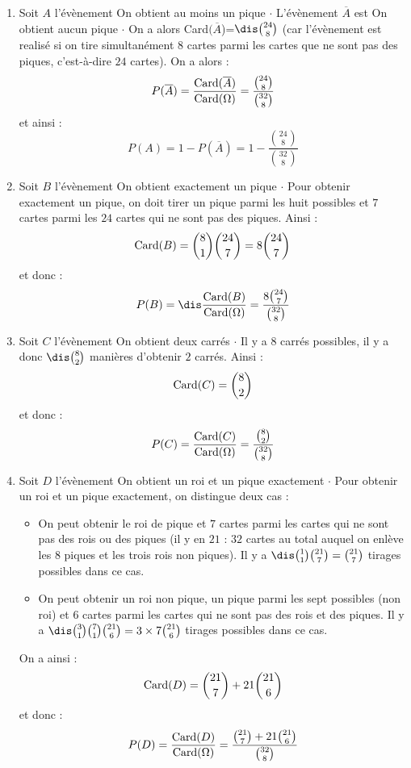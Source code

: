 \documentclass[a4paper,10pt]{report}
\begin{document}
\begin{enumerate}
\item Soit $A$ l'évènement \og On obtient au moins un pique \fg$\cdot$ L'évènement $\overline{A}$ est \og On obtient aucun pique \fg $\cdot$ On a alors Card$(\overline{A}$)=$\dis \binom{24}{8}$ (car l'évènement est realisé si on tire simultanément $8$ cartes parmi les cartes que ne sont pas des piques, c'est-à-dire $24$ cartes). On a alors :
\[ P(\overline{A}) = \frac{\hbox{Card}(\overline{A})}{\hbox{Card}(\Omega)} = \frac{\binom{24}{8}}{\binom{32}{8}}\]
et ainsi :
\[ P(A) = 1 - P(\overline{A}) = 1 - \frac{\binom{24}{8}}{\binom{32}{8}}  \]

\item Soit $B$ l'évènement \og On obtient exactement un pique \fg$\cdot$ Pour obtenir exactement un pique, on doit tirer un pique parmi les huit possibles et $7$ cartes parmi les $24$ cartes qui ne sont pas des piques. Ainsi :
\[ \hbox{Card}(B) = \binom{8}{1} \binom{24}{7} = 8 \binom{24}{7} \]
et donc :
\[ P(B) = \dis \frac{\hbox{Card}(B)}{\hbox{Card}(\Omega)} = \frac{8\binom{24}{7}}{\binom{32}{8}} \]

\item Soit $C$ l'évènement \og On obtient deux carrés \fg$\cdot$ Il y a $8$ carrés possibles, il y a donc $\dis \binom{8}{2}$ manières d'obtenir $2$ carrés. Ainsi :
\[ \hbox{Card}(C) = \binom{8}{2} \]
et donc :
\[ P(C)= \frac{\hbox{Card}(C)}{\hbox{Card}(\Omega)} = \frac{\binom{8}{2}}{\binom{32}{8}}\]

\item Soit $D$ l'évènement \og On obtient un roi et un pique exactement \fg$\cdot$ Pour obtenir un roi et un pique exactement, on distingue deux cas :
\begin{itemize}
\item On peut obtenir le roi de pique et $7$ cartes parmi les cartes qui ne sont pas des rois ou des piques (il y en $21$ : $32$ cartes au total auquel on enlève les $8$ piques et les trois rois non piques). Il y a $\dis \binom{1}{1}\binom{21}{7}=\binom{21}{7}$ tirages possibles dans ce cas.
\item On peut obtenir un roi non pique, un pique parmi les sept possibles (non roi) et $6$ cartes parmi les cartes qui ne sont pas des rois et des piques. Il y a $\dis \binom{3}{1} \binom{7}{1} \binom{21}{6}= 3 \times 7  \binom{21}{6}$ tirages possibles dans ce cas.
\end{itemize}
On a ainsi :
\[ \hbox{Card}(D) = \binom{21}{7} + 21 \binom{21}{6}\]
et donc :
\[  P(D)= \frac{\hbox{Card}(D)}{\hbox{Card}(\Omega)} = \frac{\binom{21}{7} + 21 \binom{21}{6}}{\binom{32}{8}}\]
\end{enumerate}
\end{document}

